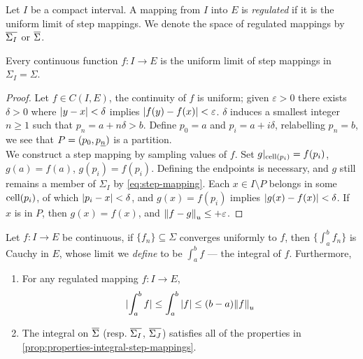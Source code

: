 \documentclass[../main-v2-manifolds.tex]{subfiles}
\begin{document}
\begin{definition}\label{def:regulated-mappings}
    Let $I$ be a compact interval. A mapping from $I$ into $E$ is \emph{regulated} if it is the uniform limit of step mappings. We denote the space of regulated mappings by $\overline{\Sigma_I}$ or $\overline{\Sigma}$.
\end{definition}
\begin{wts}\label{prop:continuity-implies-regulated-mapping}
    Every continuous function $f: I\to E$ is the uniform limit of step mappings in $\Sigma_I = \Sigma$.
\end{wts}
\begin{proof}
    Let $f\in C(I, E)$, the continuity of $f$ is uniform; given $\varepsilon>0$ there exists $\delta>0$ where $\vert {y-x} \vert<\delta$ implies $\vert {f(y)-f(x)} \vert<\varepsilon$. $\delta$ induces a smallest integer $n\geq 1$ such that $p_{n}=a + n\delta > b$. Define $p_0 = a$ and $p_i = a + i\delta$, relabelling $p_{n} = b$, we see that $P = (p_0,\UL{p}[n])$ is a partition.\\

    We construct a step mapping by sampling values of $f$. Set $g\vert_{\operatorname{cell}(p_i)}=f(p_{i})$, $g(a) = f(a)$, $g(p_i) = f(p_i)$. Defining the endpoints is necessary, and $g$ still remains a member of $\Sigma_I$ by \cref{eq:step-mapping}. Each $x\in I\setminus P$ belongs in some $\operatorname{cell}(p_i)$, of which $\vert {p_i - x} \vert<\delta$, and $g(x)=f(p_i)$ implies $\vert {g(x)-f(x)} \vert<\delta$. If $x$ is in $P$, then $g(x) = f(x)$, and $\norm{f-g}_{u}\leq+\varepsilon$.
\end{proof}
\begin{wts}\label{prop:continuous-extension-integral-to-regulated-mappings}
    Let $f: I \to E$ be continuous, if $\{f_n\}\subseteq \Sigma$ converges uniformly to $f$, then $\{\int_a^b f_n\}$ is Cauchy in $E$, whose limit we \emph{define} to be $\int_a^b f$ --- the integral of $f$. Furthermore, 
    \begin{enumerate}
        \item For any regulated mapping $f: I\to E$,
        \begin{equation}\label{eq:regulated-mapping-integral-continuous}
            \vert {\int_a^b f} \vert\leq \int_a^b\vert {f} \vert \leq (b-a)\norm{f}_u
        \end{equation}
        \item The integral on $\overline{\Sigma}$  (resp. $\overline{\Sigma_I}$, $\overline{\Sigma_J}$) satisfies all of the properties in \cref{prop:properties-integral-step-mappings}.
    \end{enumerate}
\end{wts}
\end{document}
